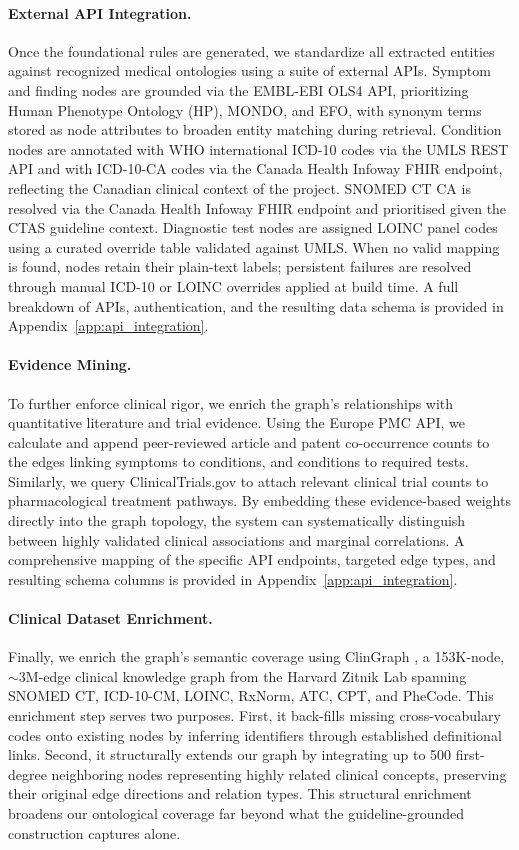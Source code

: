 \documentclass[pmlr]{jmlr}%
\begin{document}
\paragraph{External API Integration.}
Once the foundational rules are generated, we standardize all extracted entities against recognized medical ontologies using a suite of external APIs. Symptom and finding nodes are grounded via the EMBL-EBI OLS4 API, prioritizing Human Phenotype Ontology (HP), MONDO, and EFO, with synonym terms stored as node attributes to broaden entity matching during retrieval. Condition nodes are annotated with WHO international ICD-10 codes via the UMLS REST API and with ICD-10-CA codes via the Canada Health Infoway FHIR endpoint, reflecting the Canadian clinical context of the project. SNOMED CT CA is resolved via the Canada Health Infoway FHIR endpoint and prioritised given the CTAS guideline context. Diagnostic test nodes are assigned LOINC panel codes using a curated override table validated against UMLS. When no valid mapping is found, nodes retain their plain-text labels; persistent failures are resolved through manual ICD-10 or LOINC overrides applied at build time. A full breakdown of APIs, authentication, and the resulting data schema is provided in Appendix~\ref{app:api_integration}.

\paragraph{Evidence Mining.}
To further enforce clinical rigor, we enrich the graph's relationships with quantitative literature and trial evidence. Using the Europe PMC API, we calculate and append peer-reviewed article and patent co-occurrence counts to the edges linking symptoms to conditions, and conditions to required tests. Similarly, we query ClinicalTrials.gov to attach relevant clinical trial counts to pharmacological treatment pathways. By embedding these evidence-based weights directly into the graph topology, the system can systematically distinguish between highly validated clinical associations and marginal correlations. A comprehensive mapping of the specific API endpoints, targeted edge types, and resulting schema columns is provided in Appendix~\ref{app:api_integration}.

\paragraph{Clinical Dataset Enrichment.}
Finally, we enrich the graph's semantic coverage using ClinGraph \cite{johnson2024clinvec}, a 153K-node, $\sim$3M-edge clinical knowledge graph from the Harvard Zitnik Lab spanning SNOMED CT, ICD-10-CM, LOINC, RxNorm, ATC, CPT, and PheCode. This enrichment step serves two purposes. First, it back-fills missing cross-vocabulary codes onto existing nodes by inferring identifiers through established definitional links. Second, it structurally extends our graph by integrating up to 500 first-degree neighboring nodes representing highly related clinical concepts, preserving their original edge directions and relation types. This structural enrichment broadens our ontological coverage far beyond what the guideline-grounded construction captures alone.
\end{document}

